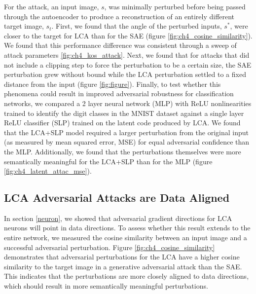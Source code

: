   For the attack, an input image, $s$, was minimally perturbed before being passed through the autoencoder to produce a reconstruction of an entirely different target image, $s_{t}$. First, we found that the angle of the perturbed inputs, $s^{*}$, were closer to the target for LCA than for the SAE (figure \ref{fig:ch4_cosine_similarity}). We found that this performance difference was consistent through a sweep of attack parameters \ref{fig:ch4_kos_attack}. Next, we found that for attacks that did not include a clipping step to force the perturbation to be a certain size, the SAE perturbation grew without bound while the LCA perturbation settled to a fixed distance from the input (figure \ref{fig:figure}). Finally, to test whether this phenomena could result in improved adversarial robustness for classification networks, we compared a 2 layer neural network (MLP) with ReLU nonlinearities trained to identify the digit classes in the MNIST dataset against a single layer ReLU classifier (SLP) trained on the latent code produced by LCA. We found that the LCA+SLP model required a larger perturbation from the original input (as measured by mean squared error, MSE) for equal adversarial confidence than the MLP. Additionally, we found that the perturbations themselves were more semantically meaningful for the LCA+SLP than for the MLP (figure \ref{fig:ch4_latent_attac_mse}).


\subsection{LCA Adversarial Attacks are Data Aligned}
In section \ref{neuron}, we showed that adversarial gradient directions for LCA neurons will point in data directions. To assess whether this result extends to the entire network, we measured the cosine similarity between an input image and a successful adversarial perturbation. Figure \ref{fig:ch4_cosine_similarity} demonstrates that adversarial perturbations for the LCA have a higher cosine similarity to the target image in a generative adversarial attack \parencite{kos2018adversarial} than the SAE. This indicates that the perturbations are more closely aligned to data directions, which should result in more semantically meaningful perturbations.

